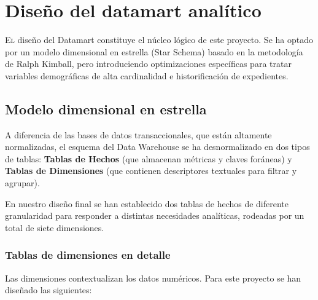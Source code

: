 \chapter{Diseño del datamart analítico}
\label{chap:diseno_datamart}

\lettrine{E}{l} diseño del Datamart constituye el núcleo lógico de este proyecto. Se ha optado por un modelo dimensional en estrella (Star Schema) basado en la metodología de Ralph Kimball, pero introduciendo optimizaciones específicas para tratar variables demográficas de alta cardinalidad e historificación de expedientes.

\section{Modelo dimensional en estrella}

A diferencia de las bases de datos transaccionales, que están altamente normalizadas, el esquema del Data Warehouse se ha desnormalizado en dos tipos de tablas: \textbf{Tablas de Hechos} (que almacenan métricas y claves foráneas) y \textbf{Tablas de Dimensiones} (que contienen descriptores textuales para filtrar y agrupar). 

En nuestro diseño final se han establecido dos tablas de hechos de diferente granularidad para responder a distintas necesidades analíticas, rodeadas por un total de siete dimensiones.

\subsection{Tablas de dimensiones en detalle}

Las dimensiones contextualizan los datos numéricos. Para este proyecto se han diseñado las siguientes:

